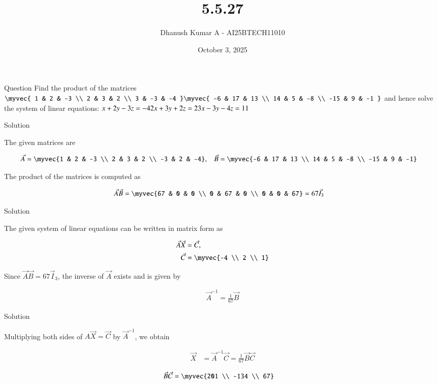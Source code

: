 \documentclass{beamer}
\title 
{5.5.27}
\date{October 3, 2025}
\author 
{Dhanush Kumar A - AI25BTECH11010}
\begin{document}
\frame{\titlepage}
\begin{frame}{Question}
\noindent
Find the product of the matrices 
$\myvec{
1 & 2 & -3 \\
2 & 3 & 2 \\
3 & -3 & -4
}
\myvec{
-6 & 17 & 13 \\
14 & 5 & -8 \\
-15 & 9 & -1
}$
and hence solve the system of linear equations:
$
x + 2y - 3z = -4 \\
2x + 3y + 2z = 2 \\
3x - 3y - 4z = 11
$


\end{frame}
\begin{frame}{Solution}

The given matrices are

\begin{align}
	\vec{A} &= \myvec{1 & 2 & -3 \\ 2 & 3 & 2 \\ -3 & 2 & -4}, &
	\vec{B} &= \myvec{-6 & 17 & 13 \\ 14 & 5 & -8 \\ -15 & 9 & -1}
\end{align}

The product of the matrices is computed as

\begin{align}
	\vec{A}\vec{B} &= \myvec{67 & 0 & 0 \\ 0 & 67 & 0 \\ 0 & 0 & 67} = 67 \vec{I}_3
\end{align}
\end{frame}
\begin{frame}{Solution}

The given system of linear equations can be written in matrix form as

\begin{align}
	\vec{A}\vec{X} &= \vec{C}, \\
\vec{C} &= \myvec{-4 \\ 2 \\ 1}
\end{align}

Since $\vec{A}\vec{B} = 67 \vec{I}_3$, the inverse of $\vec{A}$ exists and is given by

\begin{align}
	\vec{A}^{-1} = \frac{1}{67}\vec{B}
\end{align}
\end{frame}
\begin{frame}{Solution}

Multiplying both sides of $A \vec{X} = \vec{C}$ by $\vec{A}^{-1}$, we obtain

\begin{align}
	\vec{X} &= \vec{A}^{-1} \vec{C} = \frac{1}{67} \vec{B} \vec{C}
\end{align}


\begin{align}
	\vec{B} \vec{C} &= \myvec{201 \\ -134 \\ 67}
\end{align}
\end{frame}
\end{document}
